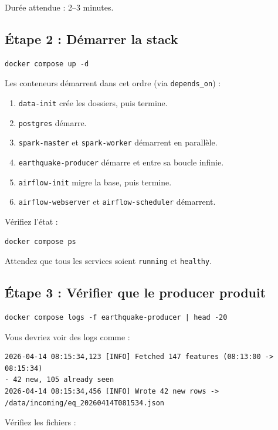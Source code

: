 \documentclass[12pt, a4paper]{article}
\begin{document}
Durée attendue : 2--3 minutes.

\subsection{Étape 2 : Démarrer la stack}

\begin{lstlisting}
docker compose up -d
\end{lstlisting}

Les conteneurs démarrent dans cet ordre (via \texttt{depends\_on}) :
\begin{enumerate}
  \item \texttt{data-init} crée les dossiers, puis termine.
  \item \texttt{postgres} démarre.
  \item \texttt{spark-master} et \texttt{spark-worker} démarrent en parallèle.
  \item \texttt{earthquake-producer} démarre et entre sa boucle infinie.
  \item \texttt{airflow-init} migre la base, puis termine.
  \item \texttt{airflow-webserver} et \texttt{airflow-scheduler} démarrent.
\end{enumerate}

Vérifiez l'état :

\begin{lstlisting}
docker compose ps
\end{lstlisting}

Attendez que tous les services soient \texttt{running} et \texttt{healthy}.

\subsection{Étape 3 : Vérifier que le producer produit}

\begin{lstlisting}
docker compose logs -f earthquake-producer | head -20
\end{lstlisting}

Vous devriez voir des logs comme :

\begin{lstlisting}
2026-04-14 08:15:34,123 [INFO] Fetched 147 features (08:13:00 -> 08:15:34)
- 42 new, 105 already seen
2026-04-14 08:15:34,456 [INFO] Wrote 42 new rows ->
/data/incoming/eq_20260414T081534.json
\end{lstlisting}

Vérifiez les fichiers :
\end{document}
